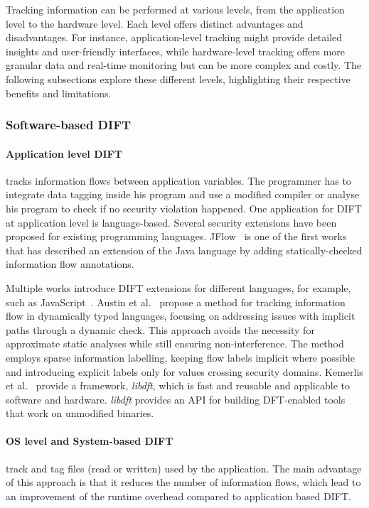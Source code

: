 Tracking information can be performed at various levels, from the application level to the hardware level. Each level offers distinct advantages and disadvantages.
For instance, application-level tracking might provide detailed insights and user-friendly interfaces, while hardware-level tracking offers more granular data and real-time monitoring but can be more complex and costly.
The following subsections explore these different levels, highlighting their respective benefits and limitations.


\subsubsection{Software-based DIFT}
\paragraph{Application level DIFT} tracks information flows between application variables. The programmer has to integrate data tagging inside his program and use a modified compiler or analyse his program to check if no security violation happened.
One application for DIFT at application level is language-based. Several security extensions have been proposed for existing programming languages.
JFlow~\cite{M-99-popl} is one of the first works that has described an extension of the Java language by adding statically-checked information flow annotations.

Multiple works introduce DIFT extensions for different languages, for example, such as JavaScript~\cite{CN-15-ccs, AF-09-plas}.
Austin et al.~\cite{AF-09-plas} propose a method for tracking information flow in dynamically typed languages, focusing on addressing issues with implicit paths through a dynamic check. This approach avoids the necessity for approximate static analyses while still ensuring non-interference. The method employs sparse information labelling, keeping flow labels implicit where possible and introducing explicit labels only for values crossing security domains.
Kemerlis et al.~\cite{KPJK-12-sigplan} provide a framework, \textit{libdft}, which is fast and reusable and applicable to software and hardware. \textit{libdft} provides an API for building DFT-enabled tools that work on unmodified binaries.

\paragraph{OS level and System-based DIFT} track and tag files (read or written) used by the application.
The main advantage of this approach is that it reduces the number of information flows, which lead to an improvement of the runtime overhead compared to application based DIFT.

